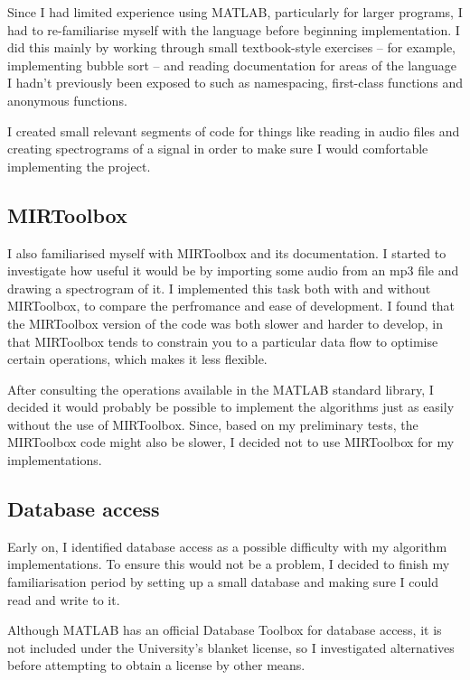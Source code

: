\documentclass[12pt,a4paper,twoside,openright]{report}
\begin{document}
Since I had limited experience using MATLAB, particularly for larger programs, I had to re-familiarise myself with the language before beginning implementation. I did this mainly by working through small textbook-style exercises -- for example, implementing bubble sort -- and reading documentation for areas of the language I hadn't previously been exposed to such as namespacing, first-class functions and anonymous functions.

I created small relevant segments of code for things like reading in audio files and creating spectrograms of a signal in order to make sure I would comfortable implementing the project.

\subsection{MIRToolbox}

I also familiarised myself with MIRToolbox and its documentation. I started to investigate how useful it would be by importing some audio from an mp3 file and drawing a spectrogram of it. I implemented this task both with and without MIRToolbox, to compare the perfromance and ease of development. I found that the MIRToolbox version of the code was both slower and harder to develop, in that MIRToolbox tends to constrain you to a particular data flow to optimise certain operations, which makes it less flexible.

After consulting the operations available in the MATLAB standard library, I decided it would probably be possible to implement the algorithms just as easily without the use of MIRToolbox. Since, based on my preliminary tests, the MIRToolbox code might also be slower, I decided not to use MIRToolbox for my implementations.

\subsection{Database access}

Early on, I identified database access as a possible difficulty with my algorithm implementations. To ensure this would not be a problem, I decided to finish my familiarisation period by setting up a small database and making sure I could read and write to it.

Although MATLAB has an official Database Toolbox for database access, it is not included under the University's blanket license, so I investigated alternatives before attempting to obtain a license by other means.
\end{document}
